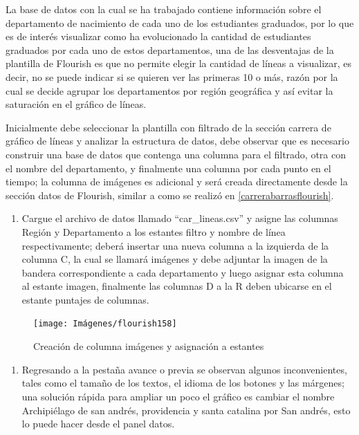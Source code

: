 \documentclass[
]{book}
\providecommand{\tightlist}{%
  \setlength{\itemsep}{0pt}\setlength{\parskip}{0pt}}
\begin{document}
La base de datos con la cual se ha trabajado contiene información sobre el departamento de nacimiento de cada uno de los estudiantes graduados, por lo que es de interés visualizar como ha evolucionado la cantidad de estudiantes graduados por cada uno de estos departamentos, una de las desventajas de la plantilla de Flourish es que no permite elegir la cantidad de líneas a visualizar, es decir, no se puede indicar si se quieren ver las primeras 10 o más, razón por la cual se decide agrupar los departamentos por región geográfica y así evitar la saturación en el gráfico de líneas.

Inicialmente debe seleccionar la plantilla con filtrado de la sección carrera de gráfico de líneas y analizar la estructura de datos, debe observar que es necesario construir una base de datos que contenga una columna para el filtrado, otra con el nombre del departamento, y finalmente una columna por cada punto en el tiempo; la columna de imágenes es adicional y será creada directamente desde la sección datos de Flourish, similar a como se realizó en \ref{carrerabarrasflourish}.

\begin{enumerate}
\def\labelenumi{\arabic{enumi}.}
\tightlist
\item
  Cargue el archivo de datos llamado ``car\_lineas.csv'' y asigne las columnas Región y Departamento a los estantes filtro y nombre de línea respectivamente; deberá insertar una nueva columna a la izquierda de la columna C, la cual se llamará imágenes y debe adjuntar la imagen de la bandera correspondiente a cada departamento y luego asignar esta columna al estante imagen, finalmente las columnas D a la R deben ubicarse en el estante puntajes de columnas.
\end{enumerate}

\begin{figure}

{\centering \texttt{[image: Imágenes/flourish158]} 

}

\caption{Creación de columna imágenes y asignación a estantes}\label{fig:paso1carlineasflourish-fig}
\end{figure}

\begin{enumerate}
\def\labelenumi{\arabic{enumi}.}
\setcounter{enumi}{1}
\tightlist
\item
  Regresando a la pestaña avance o previa se observan algunos inconvenientes, tales como el tamaño de los textos, el idioma de los botones y las márgenes; una solución rápida para ampliar un poco el gráfico es cambiar el nombre Archipiélago de san andrés, providencia y santa catalina por San andrés, esto lo puede hacer desde el panel datos.
\end{enumerate}
\end{document}
